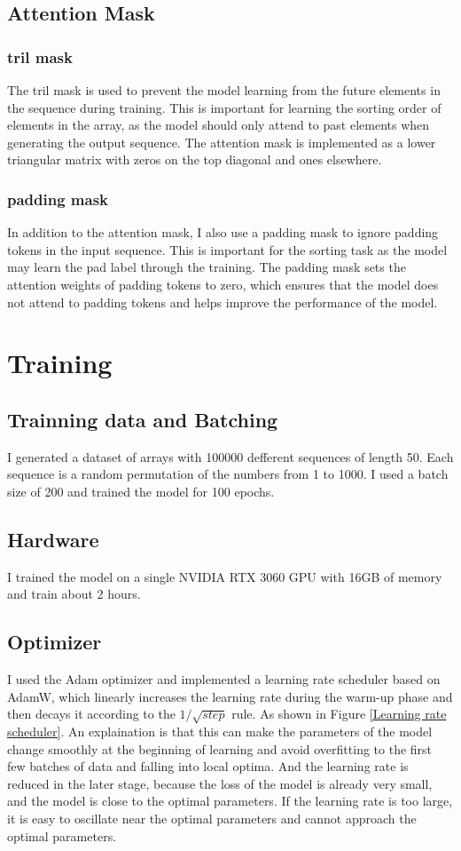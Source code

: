 \documentclass{article}
\begin{document}
\subsection{Attention Mask}
\subsubsection*{tril mask}
The tril mask is used to prevent the model learning from the future elements in the sequence during training. This is important for learning the sorting order of elements in the array, as the model should only attend to past elements when generating the output sequence. The attention mask is implemented as a lower triangular matrix with zeros on the top diagonal and ones elsewhere.

\subsubsection*{padding mask}
In addition to the attention mask, I also use a padding mask to ignore padding tokens in the input sequence. This is important for the sorting task as the model may learn the pad label through the training. The padding mask sets the attention weights of padding tokens to zero, which ensures that the model does not attend to padding tokens and helps improve the performance of the model.


\section{Training}
\subsection{Trainning data and Batching}
I generated a dataset of arrays with 100000 defferent sequences of length 50. Each sequence is a random permutation of the numbers from 1 to 1000. I used a batch size of 200 and trained the model for 100 epochs.

\subsection{Hardware}
I trained the model on a single NVIDIA RTX 3060 GPU with 16GB of memory and train about 2 hours.

\subsection{Optimizer}
I used the Adam optimizer and implemented a learning rate scheduler based on AdamW, which linearly increases the learning rate during the warm-up phase and then decays it according to the $1/\sqrt{step}$ rule. As shown in Figure \ref{Learning rate scheduler}. An explaination \cite{Opt} is that this can make the parameters of the model change smoothly at the beginning of learning and avoid overfitting to the first few batches of data and falling into local optima. And the learning rate is reduced in the later stage, because the loss of the model is already very small, and the model is close to the optimal parameters. If the learning rate is too large, it is easy to oscillate near the optimal parameters and cannot approach the optimal parameters. 
\end{document}
